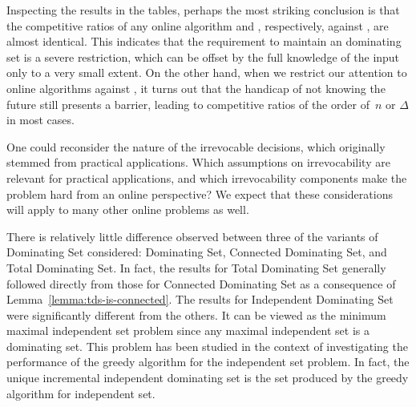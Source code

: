 Inspecting the results in the tables, perhaps the most striking conclusion
is that the competitive ratios of any online algorithm and \onopt,
respectively, against \offopt, are almost identical.
This indicates that the requirement to
maintain an \incr dominating set is a severe restriction, which can be 
offset by the full knowledge of the input only to a very small extent. 
On the other hand, when we restrict our attention to online algorithms
against \onopt,
it turns out that the handicap of not knowing the future still presents 
a barrier,
leading to competitive ratios of the order of~$n$ or $\Delta$
in most cases.

One could reconsider the nature of the irrevocable decisions, 
which originally stemmed from practical applications.
Which assumptions on irrevocability are relevant for practical 
applications, and which irrevocability components make the problem hard
from an online perspective?
We expect that these considerations will apply to many other online problems as well.

There is relatively little difference observed between three of the variants
of Dominating Set considered: Dominating Set, Connected Dominating
Set, and Total Dominating Set. In fact, the results for Total
Dominating Set generally followed directly from those for
Connected Dominating Set as a consequence of Lemma~\ref{lemma:tds-is-connected}.
The results for Independent Dominating Set were significantly different from
the others. It can be viewed as the minimum maximal
independent set problem since any maximal independent set is a
dominating set. This problem has been studied in the context of
investigating the performance of the greedy algorithm for the
independent set problem.
In fact, the unique incremental independent dominating set is the
set produced by the greedy algorithm for independent set.

